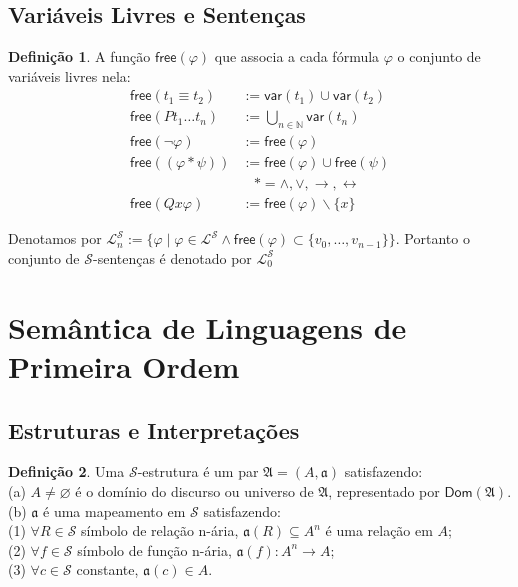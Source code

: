 \documentclass[11pt]{article}
\theoremstyle{definition}
\newtheorem{defn}{Definição}
\newcommand{\sse}{\leftrightarrow}
\newcommand{\mc}[1]{\mathcal{#1}}
\newcommand{\mf}[1]{\mathfrak{#1}}
\newcommand{\msf}[1]{\mathsf{#1}}
\newcommand{\mbb}[1]{\mathbb{#1}}
\begin{document}
\subsection{Variáveis Livres e Sentenças}

\begin{shaded}
\begin{defn}
A função $\msf{free}(\varphi)$ que associa a cada fórmula $\varphi$ o conjunto de variáveis livres nela:
\begin{align*}
    \msf{free}(t_1\equiv t_2) & := \msf{var}(t_1)\cup\msf{var}(t_2)\\
    \msf{free}(Pt_1\dots t_n) & := \bigcup_{n\in\mbb{N}}\msf{var}(t_n)\\
    \msf{free}(\neg\varphi) & := \msf{free}(\varphi)\\
    \msf{free}((\varphi*\psi)) & := \msf{free}(\varphi)\cup\msf{free}(\psi)\\
    & ~~~~*=\wedge,\vee,\to,\sse\\
    \msf{free}(Qx\varphi) & := \msf{free}(\varphi)\backslash\{x\}
\end{align*}
\end{defn}
\end{shaded}

Denotamos por $\mc{L}^\mc{S}_n:=\{\varphi\mid\varphi\in\mc{L}^\mc{S}\wedge\msf{free}(\varphi)\subset\{v_0,\dots,v_{n-1}\}\}$. Portanto o conjunto de $\mc{S}$-sentenças é denotado por $\mc{L}^\mc{S}_0$

\section{Semântica de Linguagens de Primeira Ordem}

\subsection{Estruturas e Interpretações}

\begin{shaded}
\begin{defn}
Uma $\mc{S}$-estrutura é um par $\mf{A}=(A,\mf{a})$ satisfazendo:\\
(a) $A\ne\varnothing$ é o domínio do discurso ou universo de $\mf{A}$, representado por $\msf{Dom}(\mf{A})$.\\
(b) $\mf{a}$ é uma mapeamento em $\mc{S}$ satisfazendo:\\
\phantom{aaa}(1) $\forall R\in\mc{S}$ símbolo de relação n-ária, $\mf{a}(R)\subseteq A^n$ é uma relação em $A$;\\
\phantom{aaa}(2) $\forall f\in\mc{S}$ símbolo de função n-ária, $\mf{a}(f):A^n\to A$;\\
\phantom{aaa}(3) $\forall c\in\mc{S}$ constante, $\mf{a}(c)\in A$.
\end{defn}
\end{shaded}
\end{document}
